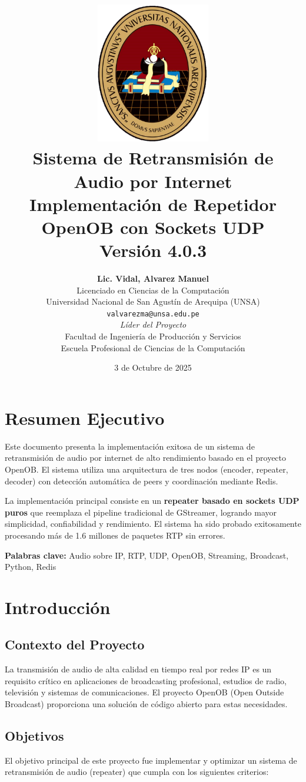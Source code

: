 \documentclass[12pt,a4paper]{article}
\title{
    \vspace{-2cm}
    \includegraphics[width=5cm]{logo-unsa.png}\\[1cm]
    \textbf{\Huge Sistema de Retransmisión de Audio por Internet}\\[0.5cm]
    \Large Implementación de Repetidor OpenOB con Sockets UDP\\[0.3cm]
    \large Versión 4.0.3
}
\author{
    \textbf{Lic. Vidal, Alvarez Manuel}\\
    Licenciado en Ciencias de la Computación\\
    Universidad Nacional de San Agustín de Arequipa (UNSA)\\[0.3cm]
    \texttt{valvarezma@unsa.edu.pe}\\[0.5cm]
    \textit{Líder del Proyecto}\\[1cm]
    \small Facultad de Ingeniería de Producción y Servicios\\
    \small Escuela Profesional de Ciencias de la Computación
}
\date{3 de Octubre de 2025}
\begin{document}
\maketitle
\thispagestyle{empty}
\newpage

\tableofcontents
\newpage

\listoffigures
\listoftables
\newpage

\section*{Resumen Ejecutivo}

Este documento presenta la implementación exitosa de un sistema de retransmisión de audio por internet de alto rendimiento basado en el proyecto OpenOB. El sistema utiliza una arquitectura de tres nodos (encoder, repeater, decoder) con detección automática de peers y coordinación mediante Redis.

La implementación principal consiste en un \textbf{repeater basado en sockets UDP puros} que reemplaza el pipeline tradicional de GStreamer, logrando mayor simplicidad, confiabilidad y rendimiento. El sistema ha sido probado exitosamente procesando más de 1.6 millones de paquetes RTP sin errores.

\textbf{Palabras clave:} Audio sobre IP, RTP, UDP, OpenOB, Streaming, Broadcast, Python, Redis

\newpage

\section{Introducción}

\subsection{Contexto del Proyecto}

La transmisión de audio de alta calidad en tiempo real por redes IP es un requisito crítico en aplicaciones de broadcasting profesional, estudios de radio, televisión y sistemas de comunicaciones. El proyecto OpenOB (Open Outside Broadcast) proporciona una solución de código abierto para estas necesidades.

\subsection{Objetivos}

El objetivo principal de este proyecto fue implementar y optimizar un sistema de retransmisión de audio (repeater) que cumpla con los siguientes criterios:
\end{document}
